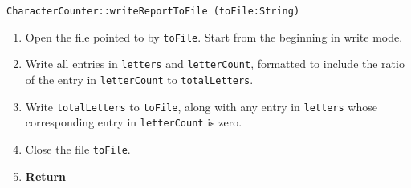 \vspace{5mm}
\texttt{CharacterCounter::writeReportToFile (toFile:String)}
\begin{enumerate}
	\item Open the file pointed to by \texttt{toFile}. Start from the beginning in write mode.
	\item Write all entries in \texttt{letters} and \texttt{letterCount}, formatted to include the ratio of the
		entry in \texttt{letterCount} to \texttt{totalLetters}.
	\item Write \texttt{totalLetters} to \texttt{toFile}, along with any entry in \texttt{letters} whose corresponding entry in
		\texttt{letterCount} is zero.
	\item Close the file \texttt{toFile}.
	\item \textbf{Return} 
\end{enumerate}

\sourcecode



